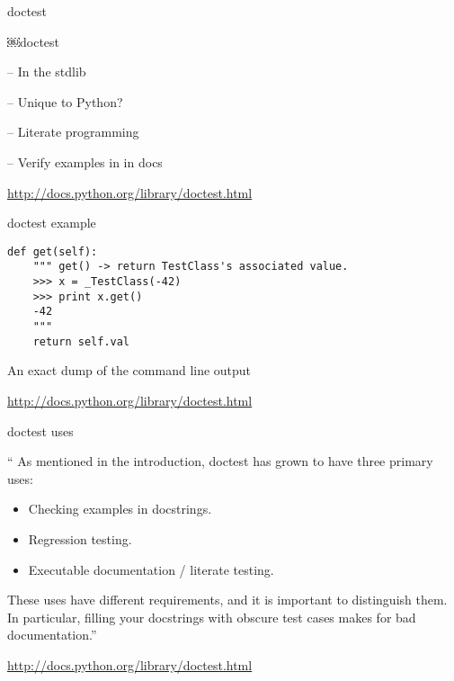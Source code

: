 \documentclass{beamer}
\begin{document}
\begin{frame}[fragile]{doctest}

{\LARGE￼doctest}

\vfill
{\Large \vspace{0.3in} -- In the stdlib}

\vfill
{\Large \vspace{0.3in} -- Unique to Python?}

\vfill
{\Large \vspace{0.3in} -- Literate programming}

\vfill
{\Large \vspace{0.3in} -- Verify examples in in docs}

\vfill
\url{http://docs.python.org/library/doctest.html}


\end{frame} 

\begin{frame}[fragile]{doctest example}

\begin{verbatim}
def get(self):
    """ get() -> return TestClass's associated value.
    >>> x = _TestClass(-42)
    >>> print x.get()
    -42
    """
    return self.val
\end{verbatim}

\vfill
{\Large An exact dump of the command line output}

\vfill
\url{http://docs.python.org/library/doctest.html}
\end{frame} 

\begin{frame}[fragile]{doctest uses}

{\large
``
As mentioned in the introduction, doctest has grown to have three primary uses:

\begin{itemize}
    \item Checking examples in docstrings.
    \item Regression testing.
    \item Executable documentation / literate testing.
\end{itemize}

These uses have different requirements, and it is important to distinguish them.
In particular, filling your docstrings with obscure test cases makes for bad
documentation.''
}

\vfill
\url{http://docs.python.org/library/doctest.html}
\end{frame} 
\end{document}
